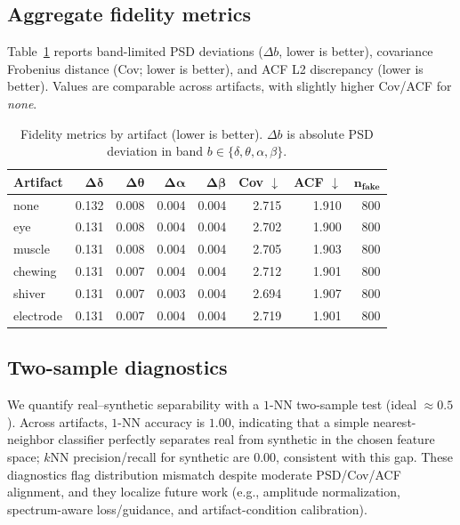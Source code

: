 \documentclass{article}
\begin{document}
\subsection{Aggregate fidelity metrics}
Table~\ref{tab:fidelity} reports band-limited PSD deviations ($\Delta b$, lower is better), covariance Frobenius distance (Cov; lower is better), and ACF L2 discrepancy (lower is better). Values are comparable across artifacts, with slightly higher Cov/ACF for \emph{none}.

\begin{table}[t]
  \centering
  \caption{Fidelity metrics by artifact (lower is better). $\Delta b$ is absolute PSD deviation in band $b\!\in\!\{\delta,\theta,\alpha,\beta\}$.}
  \label{tab:fidelity}
  \vspace{0.25em}
  \small
  \begin{tabular}{lrrrrrrr}
    \toprule
    \textbf{Artifact} & $\mathbf{\Delta\delta}$ & $\mathbf{\Delta\theta}$ & $\mathbf{\Delta\alpha}$ & $\mathbf{\Delta\beta}$ & \textbf{Cov} $\downarrow$ & \textbf{ACF} $\downarrow$ & $\mathbf{n_{\text{fake}}}$ \\
    \midrule
    none       & 0.132 & 0.008 & 0.004 & 0.004 & 2.715 & 1.910 & 800 \\
    eye        & 0.131 & 0.008 & 0.004 & 0.004 & 2.702 & 1.900 & 800 \\
    muscle     & 0.131 & 0.008 & 0.004 & 0.004 & 2.705 & 1.903 & 800 \\
    chewing    & 0.131 & 0.007 & 0.004 & 0.004 & 2.712 & 1.901 & 800 \\
    shiver     & 0.131 & 0.007 & 0.003 & 0.004 & 2.694 & 1.907 & 800 \\
    electrode  & 0.131 & 0.007 & 0.004 & 0.004 & 2.719 & 1.901 & 800 \\
    \bottomrule
  \end{tabular}
\end{table}

\subsection{Two-sample diagnostics}
We quantify real–synthetic separability with a $1$-NN two-sample test (ideal $\approx 0.5$). Across artifacts, $1$-NN accuracy is $1.00$, indicating that a simple nearest-neighbor classifier perfectly separates real from synthetic in the chosen feature space; $k$NN precision/recall for synthetic are $0.00$, consistent with this gap. These diagnostics flag distribution mismatch despite moderate PSD/Cov/ACF alignment, and they localize future work (e.g., amplitude normalization, spectrum-aware loss/guidance, and artifact-condition calibration).
\end{document}
